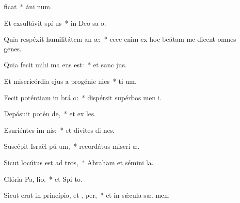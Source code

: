 \item {}ficat~* áni  num.
\item Et exsultávit spí us~* in Deo sa o.
\item Quia respéxit humilitátem an æ:~* ecce enim ex hoc beátam me dicent omnes genes.
\item Quia fecit mihi ma  ens est:~* et sanc  jus.
\item Et misericórdia ejus a progénie  nies~* ti um.
\item Fecit poténtiam in brá o:~* dispérsit supérbos men  i.
\item Depósuit potén  de,~* et ex les.
\item Esuriéntes im nis:~* et dívites di nes.
\item Suscépit Israël pú um,~* recordátus miseri æ.
\item Sicut locútus est ad  tros,~* Abraham et sémini   la.
\item Glória Pa,  lio,~* et Spi to.
\item Sicut erat in princípio, et ,  per,~* et in sǽcula sæ. men.
